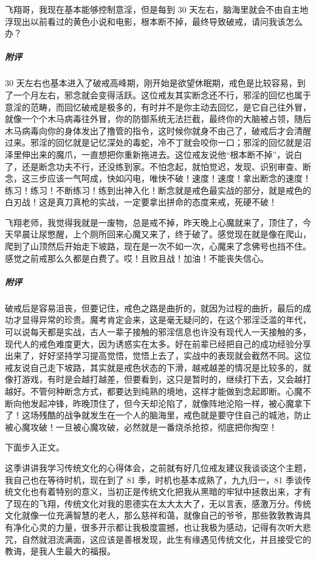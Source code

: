 \begin{case}
    飞翔哥，我现在基本能够控制意淫，但是每到 30 天左右，脑海里就会不由自主地浮现出以前看过的黄色小说和电影，根本断不掉，最终导致破戒，请问我该怎么办？
    \subparagraph{附评} 30 天左右也基本进入了破戒高峰期，刚开始是欲望休眠期，戒色是比较容易，到了一个月左右，邪念就会变得活跃。这位戒友其实断念还不行，邪淫的回忆也属于意淫的范畴，而回忆破戒是极多的，有时并不是你主动去回忆，是它自己往外冒，就像一个个木马病毒往外冒，你的防御系统无法拦截，最终你的大脑被占领，随后木马病毒向你的身体发出了撸管的指令，这时候你就身不由己了，破戒后才会清醒过来。邪淫的回忆就是记忆深处的毒蛇，冷不丁就会咬你一口；邪淫的回忆就是沼泽里伸出来的魔爪，一直想把你重新拖进去。这位戒友说他“根本断不掉”，说白了，还是断念功夫不行，还没练到家。不怕念起，就怕觉迟，发现、识别审查、断念，这三步应该一气呵成，快如闪电，唯快不破！速度！速度！拿出断念的速度！练习！练习！不断练习！练到出神入化！断念就是戒色最实战的部分，就是戒色的白刃战！这是真刀真枪的实战，一定要拿出拼命的态度来戒，死硬不破！
\end{case}

\begin{case}
    飞翔老师，我觉得我就是一废物，总是戒不掉，昨天晚上心魔就来了，顶住了，今天早晨让尿憋醒，上个厕所回来心魔又来了，终于破了。感觉现在就是像在爬山，爬到了山顶然后开始走下坡路，现在是一次不如一次，心魔来了念佛号也挡不住。感觉之前戒那么久都是白费了。哎！且败且战！加油！不能丧失信心。
    \subparagraph{附评} 破戒后是容易沮丧，但要记住，戒色之路是曲折的，就因为过程的曲折，最后的成功才显得异常的珍贵。魔考肯定会来，这是毫无疑问的，在这个邪淫泛滥的年代，可以说每天都是实战，古人一辈子接触的邪淫信息也许没有现代人一天接触的多，现代人的戒色难度更大，因为诱惑实在太多。好在前辈已经把自己的成功经验分享出来了，好好坚持学习提高觉悟，觉悟上去了，实战中的表现就会截然不同。这位戒友说自己走下坡路，其实就是戒色状态的下滑，越戒越差的情况是比较多的，就像打游戏，有时是会越打越差，但要看到，这只是暂时的，继续打下去，又会越打越好。不管何种断念方式，都要达到纯熟的境地，这样才能做到念起即断。心魔不断向他发起冲锋，昨晚顶住了，但今天却沦陷了，就像阵地沦陷一样，被心魔拿下了！这场残酷的战争就发生在一个人的脑海里，戒色就是要守住自己的城池，防止被心魔攻破！一旦被心魔攻破，必然就是一番烧杀抢掠，彻底把你掏空！
\end{case}

下面步入正文。

这季讲讲我学习传统文化的心得体会，之前就有好几位戒友建议我谈谈这个主题，我自己也在等待时机，现在到了 81 季，时机也基本成熟了，九九归一，81 季谈传统文化也有着特别的意义，当初正是传统文化把我从黑暗的牢狱中拯救出来，才有了现在的飞翔，传统文化对我的恩德实在太大太大了，无以言表，感激万分。传统文化就像一位充满智慧的老人，那么慈祥和蔼，就像自己的爷爷，那些敦敦教诲具有净化心灵的力量，很多开示都让我极度震撼，也让我极为感动，记得有次听大悲咒，自然就泪流满面，这应该是善根发现，此生有缘遇见传统文化，并且接受它的教诲，是我人生最大的福报。

